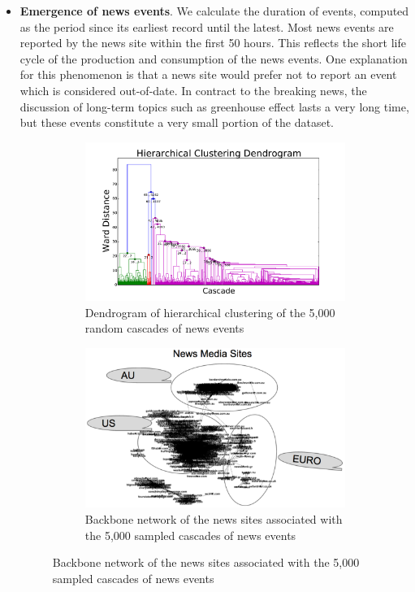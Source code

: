 \begin{itemize}
\item \textbf{Emergence of news events}.
We calculate the duration of events, computed as the period since its earliest record until the latest. Most news events are reported by the news site within the first 50 hours. This reflects the short life cycle of the production and consumption of the news events. One explanation for this phenomenon is that a news site would prefer not to report an event which is considered out-of-date. In contract to the breaking news, the discussion of long-term topics such as greenhouse effect lasts a very long time, but these events constitute a very small portion of the dataset.

\begin{figure}[t!]
\centering
\begin{subfigure}{.5\textwidth}
\centering
\includegraphics[width=.99\linewidth]{img/chap3/dendro.pdf}
\caption{Dendrogram of hierarchical clustering of the 5,000 random cascades of news events} \label{fig:dendro}
\end{subfigure}
\begin{subfigure}{.45\textwidth}
\includegraphics[width=.99\linewidth]{img/chap3/news_sites_graph.pdf}
\caption{Backbone network of the news sites associated with the 5,000 sampled cascades of news events} \label{fig:backbone}
\end{subfigure}


\end{figure}
\end{itemize}
